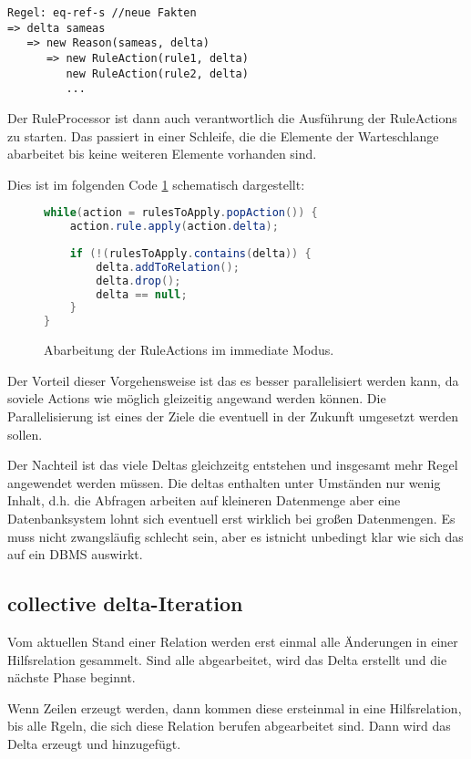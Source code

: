 \begin{verbatim}
Regel: eq-ref-s //neue Fakten
=> delta sameas
   => new Reason(sameas, delta)
      => new RuleAction(rule1, delta)
         new RuleAction(rule2, delta)
         ...
\end{verbatim}

Der RuleProcessor ist dann auch verantwortlich die Ausführung der RuleActions zu starten. Das passiert in einer Schleife, die die Elemente der Warteschlange abarbeitet bis keine weiteren Elemente vorhanden sind.

Dies ist im folgenden Code \ref{code-immediate-delta-iteration} schematisch dargestellt:

\begin{figure}[htp]
	\caption{Abarbeitung der RuleActions im immediate Modus.}
	\label{code-immediate-delta-iteration}
	\begin{lstlisting}[language=Java]
while(action = rulesToApply.popAction()) {
	action.rule.apply(action.delta);
	
	if (!(rulesToApply.contains(delta)) {
		delta.addToRelation();
		delta.drop();
		delta == null;
	}
}
	\end{lstlisting}
\end{figure}


Der Vorteil dieser Vorgehensweise ist das es besser parallelisiert werden kann, da soviele Actions wie möglich gleizeitig angewand werden können. Die Parallelisierung ist eines der Ziele die eventuell in der Zukunft umgesetzt werden sollen.

Der Nachteil ist das viele Deltas gleichzeitg entstehen und insgesamt mehr Regel angewendet werden müssen. Die deltas enthalten unter Umständen nur wenig Inhalt, d.h. die Abfragen arbeiten auf kleineren Datenmenge aber eine Datenbanksystem lohnt sich eventuell erst wirklich bei großen Datenmengen. Es muss nicht zwangsläufig schlecht sein, aber es istnicht unbedingt klar wie sich das auf ein DBMS auswirkt.

\subsection{collective delta-Iteration}

Vom aktuellen Stand einer Relation werden erst einmal alle Änderungen in einer Hilfsrelation gesammelt. Sind alle abgearbeitet, wird das Delta erstellt und die nächste Phase beginnt.

Wenn Zeilen erzeugt werden, dann kommen diese ersteinmal in eine Hilfsrelation, bis alle Rgeln, die sich diese Relation berufen abgearbeitet sind. Dann wird das Delta erzeugt und hinzugefügt.

